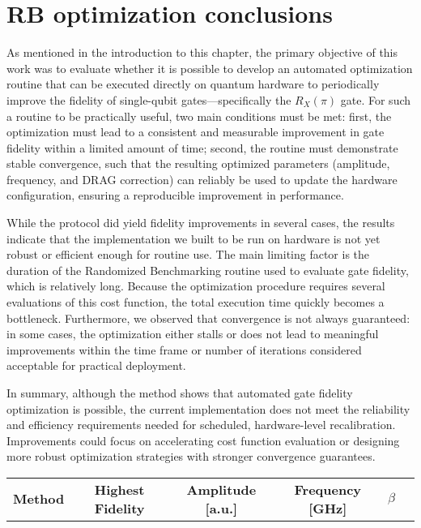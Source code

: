 \section{RB optimization conclusions}
As mentioned in the introduction to this chapter, the primary objective of this work was to evaluate whether it is possible to develop an automated optimization routine that can be executed directly on quantum hardware to periodically improve the fidelity of single-qubit gates—specifically the  $R_X(\pi)$ gate. 
For such a routine to be practically useful, two main conditions must be met: first, the optimization must lead to a consistent and measurable improvement in gate fidelity within a limited amount of time; 
second, the routine must demonstrate stable convergence, such that the resulting optimized parameters (amplitude, frequency, and DRAG correction) can reliably be used to update the hardware configuration, ensuring a reproducible improvement in performance.

While the protocol did yield fidelity improvements in several cases, the results indicate that the implementation we built to be run on hardware is not yet robust or efficient enough for routine use. 
The main limiting factor is the duration of the Randomized Benchmarking routine used to evaluate gate fidelity, which is relatively long. 
Because the optimization procedure requires several evaluations of this cost function, the total execution time quickly becomes a bottleneck. 
Furthermore, we observed that convergence is not always guaranteed: in some cases, the optimization either stalls or does not lead to meaningful improvements within the time frame or number of iterations considered acceptable for practical deployment.

In summary, although the method shows that automated gate fidelity optimization is possible, the current implementation does not meet the reliability and efficiency requirements needed for scheduled, hardware-level recalibration. 
Improvements could focus on accelerating cost function evaluation or designing more robust optimization strategies with stronger convergence guarantees.

\begin{tabular}{lccccc}
    \textbf{Method} & \textbf{Highest Fidelity} & \textbf{Amplitude [a.u.]} & \textbf{Frequency [GHz]} & \textbf{$\beta$} \\

\end{tabular}

